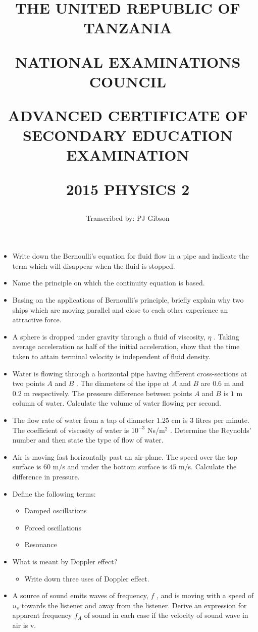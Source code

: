 \documentclass{article}
\title{THE UNITED REPUBLIC OF TANZANIA

NATIONAL EXAMINATIONS COUNCIL

ADVANCED CERTIFICATE OF SECONDARY EDUCATION EXAMINATION

\textbf{2015 PHYSICS 2}}
\author{Transcribed by:  PJ Gibson}
\begin{document}
\maketitle

\begin{itemize}
\item Write down the Bernoulli’s equation for fluid flow in a pipe and indicate the term which will disappear when the fluid is stopped.
\item Name the principle on which the continuity equation is based.
\item Basing on the applications of Bernoulli’s principle, briefly explain why two ships which are moving parallel and close to each other experience an attractive force.
\item A sphere is dropped under gravity through a fluid of viscosity, $ \eta $ .  Taking average acceleration as half of the initial acceleration, show that the time taken to attain terminal velocity is independent of fluid density.
\item Water is flowing through a horizontal pipe having different cross-sections at two points $ A$ and $ B$ .  The diameters of the ippe at $ A$ and $ B$ are $ 0.6$ m and $ 0.2$ m respectively.   The pressure difference between points $ A$ and $ B$ is $ 1$ m column of water.  Calculate the volume of water flowing per second.
\item The flow rate of water from a tap of diameter $ 1.25$ cm is $ 3$ litres per minute.  The coefficient of viscosity of water is $ 10^{-3}$ Ns/m$ ^{2}$ .  Determine the Reynolds’ number and then state the type of flow of water.
\item Air is moving fast horizontally past an air-plane.  The speed over the top surface is $ 60$ m$/$s and under the bottom surface is $ 45$ m$/$s.  Calculate the difference in pressure.
\item Define the following terms:
 \begin{itemize}
\item Damped oscillations
\item Forced oscillations
\item Resonance
\end{itemize}
\item What is meant by Doppler effect?
 \begin{itemize}
\item Write down three uses of Doppler effect.
\end{itemize}
\item A source of sound emits waves of frequency, $ f$ , and is moving with a speed of $ u_{s}$ towards the listener and away from the listener.  Derive an expression for apparent frequency $ f_{A}$ of sound in each case if the velocity of sound wave in air is v.  

\end{itemize}
\end{document}
